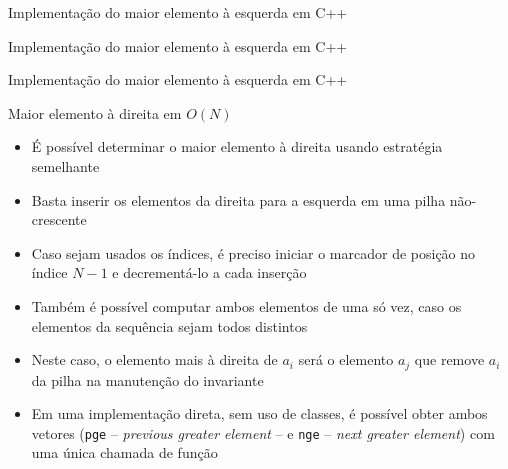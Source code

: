 \begin{frame}[fragile]{Implementação do maior elemento à esquerda em C++}
\end{frame}

\begin{frame}[fragile]{Implementação do maior elemento à esquerda em C++}
\end{frame}

\begin{frame}[fragile]{Implementação do maior elemento à esquerda em C++}
\end{frame}

\begin{frame}[fragile]{Maior elemento à direita em $O(N)$}

    \begin{itemize}
        \item É possível determinar o maior elemento à direita usando estratégia semelhante

        \item Basta inserir os elementos da direita para a esquerda em uma pilha não-crescente

        \item Caso sejam usados os índices, é preciso iniciar o marcador de posição no índice 
            $N - 1$ e decrementá-lo a cada inserção

        \item Também é possível computar ambos elementos de uma só vez, caso os elementos da sequência
            sejam todos distintos

        \item Neste caso, o elemento mais à direita de
            $a_i$ será o elemento $a_j$ que remove $a_i$ da pilha na manutenção do invariante

        \item Em uma implementação direta, sem uso de classes, é possível obter ambos vetores
            (\texttt{pge} -- \textit{previous greater element} -- e \texttt{nge} -- \textit{next
            greater element}) com uma única chamada de função
    \end{itemize}
\end{frame}
